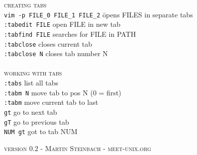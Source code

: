 \documentclass[a4paper,10pt]{scrartcl}
\begin{document}
\begin{multicols}{2}
\begin{tabbing}
\end{tabbing}


\end{multicols}


\begin{tabbing}
\large{\textsc{creating tabs}}\\
\texttt{vim -p FILE\_0 FILE\_1 FILE\_2}	\hspace{0.5 cm}\= opens FILES in separate tabs\\
\texttt{:tabedit FILE}					\> open FILE in new tab\\
\texttt{:tabfind FILE}					\> searches for FILE in PATH\\
\texttt{:tabclose}						\> closes current tab\\
\texttt{:tabclose N}					\> closes tab number  N\\\\

\large{\textsc{working with tabs}}\\
\texttt{:tabs}			\> list all tabs\\
\texttt{:tabm N}		\> move tab to pos N (0 = first)\\
\texttt{:tabm}			\> move current tab to last\\
\texttt{gt}				\> go to next tab\\
\texttt{gT}				\> go to previous tab\\
\texttt{NUM gt}			\> got to tab NUM\\
\end{tabbing}

\centering\textsc{version 0.2 - Martin Steinbach - meet-unix.org}
\end{document}
